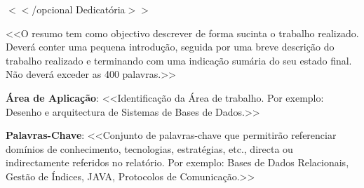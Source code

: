 \documentclass[a4paper,12pt]{scrreprt}
\begin{document}

\makecover



\clearpage
\begin{center}
    \thispagestyle{empty}
    \vspace*{\fill}
    
    $<<$/opcional Dedicatória$>>$
    
    \vspace*{\fill}
\end{center}
\clearpage






\renewenvironment{abstract}
 {\par\noindent\textbf{\Large\abstractname}\par\bigskip}
 {}

\begin{flushleft}
\begin{abstract}
    <<O resumo tem como objectivo descrever de forma sucinta o trabalho realizado. Deverá conter uma pequena introdução, seguida por uma breve descrição do trabalho realizado e terminando com uma indicação sumária do seu estado final. Não deverá exceder as 400 palavras.>> 
    \par \textbf{Área de Aplicação}: <<Identificação da Área de trabalho. Por exemplo: Desenho e arquitectura de Sistemas de Bases de Dados.>> 
    \par \textbf{Palavras-Chave}: <<Conjunto de palavras-chave que permitirão referenciar domínios de conhecimento, tecnologias, estratégias, etc., directa ou indirectamente referidos no relatório. Por exemplo: Bases de Dados Relacionais, Gestão de Índices, JAVA, Protocolos de Comunicação.>>
\end{abstract}
\end{flushleft}
\end{document}
